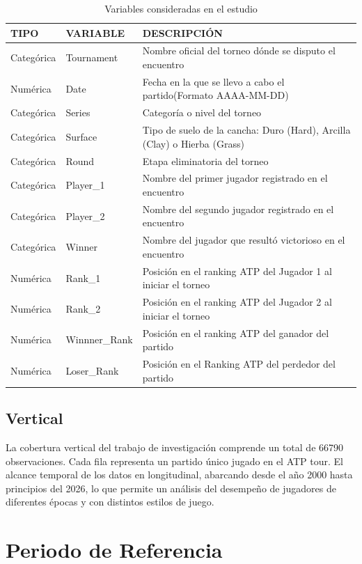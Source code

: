 \documentclass[oneside,11pt]{Latex/Classes/PhDthesisPSnPDF}
\begin{document}
\begin{table}[ht]
\centering
\caption{Variables consideradas en el estudio} 
\label{tab:variables}
\renewcommand{\arraystretch}{1.4}%
\begin{tabularx}{\textwidth}{llX} %
  \hline
\textbf{TIPO} &\textbf{VARIABLE} &\textbf{DESCRIPCIÓN}\\ 
  \hline
Categórica & Tournament & Nombre oficial del torneo dónde se disputo el encuentro\\ 
Numérica & Date & Fecha en la que se llevo a cabo el partido(Formato AAAA-MM-DD)\\
Categórica & Series & Categoría o nivel del torneo\\
Categórica & Surface & Tipo de suelo de la cancha: Duro (Hard), Arcilla (Clay) o Hierba (Grass)\\
Categórica & Round & Etapa eliminatoria del torneo\\
Categórica & Player\_1 & Nombre del primer jugador registrado en el encuentro\\
Categórica & Player\_2 & Nombre del segundo jugador registrado en el encuentro\\
Categórica & Winner & Nombre del jugador que resultó victorioso en el encuentro\\
Numérica & Rank\_1 & Posición en el ranking ATP del Jugador 1 al iniciar el torneo\\
Numérica & Rank\_2 & Posición en el ranking ATP del Jugador 2 al iniciar el torneo\\
Numérica & Winnner\_Rank & Posición en el ranking ATP del ganador del partido\\
Numérica & Loser\_Rank & Posición en el Ranking ATP del perdedor del partido\\
   \hline
\end{tabularx}
\end{table}

\subsection{Vertical}

La cobertura vertical del trabajo de investigación comprende un total de
66790 observaciones. Cada fila representa un partido único jugado en el
ATP tour. El alcance temporal de los datos en longitudinal, abarcando
desde el año 2000 hasta principios del 2026, lo que permite un análisis
del desempeño de jugadores de diferentes épocas y con distintos estilos
de juego.

\section{Periodo de Referencia}
\end{document}
